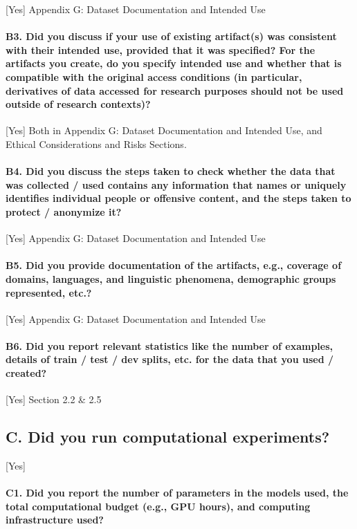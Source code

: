 \documentclass{article}
\begin{document}
[Yes] Appendix G: Dataset Documentation and Intended Use
\paragraph{B3. Did you discuss if your use of existing artifact(s) was consistent with their intended use, provided that it was specified? For the artifacts you create, do you specify intended use and whether that is compatible with the original access conditions (in particular, derivatives of data accessed for research purposes should not be used outside of research contexts)?}

[Yes] Both in Appendix G: Dataset Documentation and Intended Use, and Ethical Considerations and Risks Sections.
\paragraph{B4. Did you discuss the steps taken to check whether the data that was collected / used contains any information that names or uniquely identifies individual people or offensive content, and the steps taken to protect / anonymize it?}

[Yes] Appendix G: Dataset Documentation and Intended Use
\paragraph{B5. Did you provide documentation of the artifacts, e.g., coverage of domains, languages, and linguistic phenomena, demographic groups represented, etc.?}

[Yes] Appendix G: Dataset Documentation and Intended Use
\paragraph{B6. Did you report relevant statistics like the number of examples, details of train / test / dev splits, etc. for the data that you used / created?}

[Yes] Section 2.2 \& 2.5
\subsection*{C. Did you run computational experiments?} [Yes]
\paragraph*{C1. Did you report the number of parameters in the models used, the total computational budget (e.g., GPU hours), and computing infrastructure used?}
\end{document}
